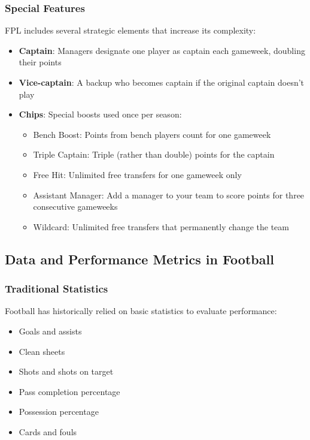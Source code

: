 \subsubsection{Special Features}

FPL includes several strategic elements that increase its complexity:
\begin{itemize}
    \item \textbf{Captain}: Managers designate one player as captain each gameweek, doubling their points
    \item \textbf{Vice-captain}: A backup who becomes captain if the original captain doesn't play
    \item \textbf{Chips}: Special boosts used once per season:
    \begin{itemize}
        \item Bench Boost: Points from bench players count for one gameweek
        \item Triple Captain: Triple (rather than double) points for the captain
        \item Free Hit: Unlimited free transfers for one gameweek only
        \item Assistant Manager: Add a manager to your team to score points for three consecutive gameweeks
        \item Wildcard: Unlimited free transfers that permanently change the team \cite{fpl2024rules}
    \end{itemize}
\end{itemize}

\subsection{Data and Performance Metrics in Football}

\subsubsection{Traditional Statistics}

Football has historically relied on basic statistics to evaluate performance:
\begin{itemize}
    \item Goals and assists
    \item Clean sheets
    \item Shots and shots on target
    \item Pass completion percentage
    \item Possession percentage
    \item Cards and fouls \cite{hughes2005}
\end{itemize}

